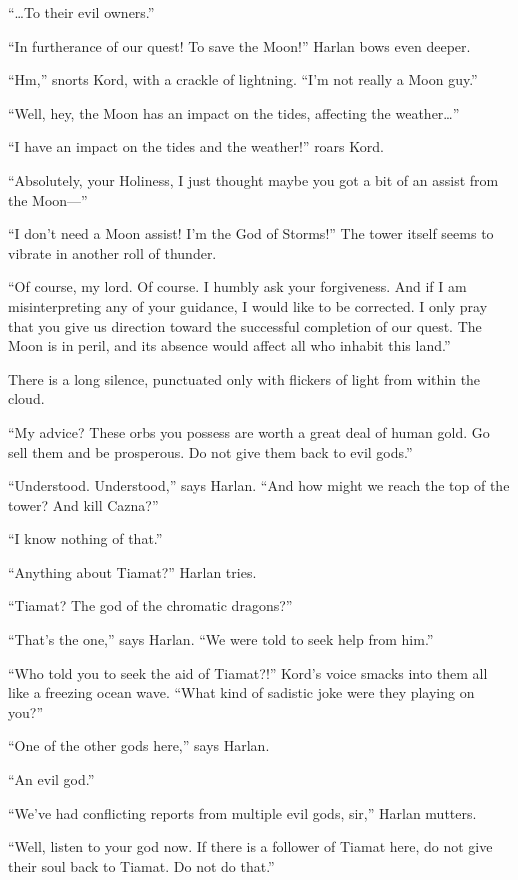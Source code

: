 \documentclass[smalldemyvopaper,11pt,twoside,onecolumn,openright,extrafontsizes]{memoir}
\begin{document}
``\ldots To their evil owners.''

``In furtherance of our quest! To save the Moon!'' Harlan bows even
deeper.

``Hm,'' snorts Kord, with a crackle of lightning. ``I'm not really a
Moon guy.''

``Well, hey, the Moon has an impact on the tides, affecting the
weather\ldots{}''

``I have an impact on the tides and the weather!'' roars Kord.

``Absolutely, your Holiness, I just thought maybe you got a bit of an
assist from the Moon---''

``I don't need a Moon assist! I'm the God of Storms!'' The tower itself
seems to vibrate in another roll of thunder.

``Of course, my lord. Of course. I humbly ask your forgiveness. And if I
am misinterpreting any of your guidance, I would like to be corrected. I
only pray that you give us direction toward the successful completion of
our quest. The Moon is in peril, and its absence would affect all who
inhabit this land.''

There is a long silence, punctuated only with flickers of light from
within the cloud.

``My advice? These orbs you possess are worth a great deal of human
gold. Go sell them and be prosperous. Do not give them back to evil
gods.''

``Understood. Understood,'' says Harlan. ``And how might we reach the
top of the tower? And kill Cazna?''

``I know nothing of that.''

``Anything about Tiamat?'' Harlan tries.

``Tiamat? The god of the chromatic dragons?''

``That's the one,'' says Harlan. ``We were told to seek help from him.''

``Who told you to seek the aid of Tiamat?!'' Kord's voice smacks into
them all like a freezing ocean wave. ``What kind of sadistic joke were
they playing on you?''

``One of the other gods here,'' says Harlan.

``An evil god.''

``We've had conflicting reports from multiple evil gods, sir,'' Harlan
mutters.

``Well, listen to your god now. If there is a follower of Tiamat here,
do not give their soul back to Tiamat. Do not do that.''
\end{document}
